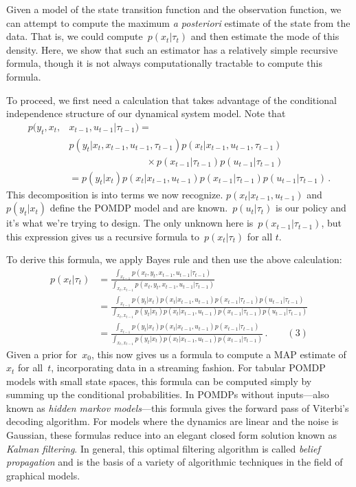 \documentclass{tufte-book}
\begin{document}
Given a model of the state transition function and the observation
function, we can attempt to compute the maximum \emph{a posteriori}
estimate of the state from the data. That is, we could
compute~\(p(x_t | \tau_t)\) and then estimate the mode of this density.
Here, we show that such an estimator has a relatively simple recursive
formula, though it is not always computationally tractable to compute
this formula.

To proceed, we first need a calculation that takes advantage of the
conditional independence structure of our dynamical system model. Note
that \[
\begin{aligned}
p(y_t, x_t, & x_{t-1}, u_{t-1} | \tau_{t-1} )
= \\
&p(y_t| x_t, x_{t-1}, u_{t-1}, \tau_{t-1} )
p(x_t | x_{t-1},u_{t-1}, \tau_{t-1} )\\
 &\qquad\qquad\qquad\qquad\times p(x_{t-1}|\tau_{t-1} )
p(u_{t-1}|\tau_{t-1} )\\
&= p(y_t| x_t )
p(x_t | x_{t-1},u_{t-1} )
p(x_{t-1}|\tau_{t-1} )
p(u_{t-1}|\tau_{t-1} )\,.
\end{aligned}
\] This decomposition is into terms we now recognize.
\(p(x_t | x_{t-1},u_{t-1} )\) and~\(p(y_t| x_t )\) define the POMDP
model and are known.~\(p(u_t|\tau_t)\) is our policy and it's what we're
trying to design. The only unknown here is~\(p(x_{t-1}|\tau_{t-1} )\),
but this expression gives us a recursive formula
to~\(p(x_{t}|\tau_{t} )\) for all \(t\).

To derive this formula, we apply Bayes rule and then use the above
calculation: \[
\begin{aligned}
p(x_t | \tau_t) &=\frac{\int_{x_{t-1}} p(x_t , y_t, x_{t-1}, u_{t-1} | \tau_{t-1}) }
                                                {\int_{x_t,x_{t-1}} p(x_t , y_t, x_{t-1}, u_{t-1}| \tau_{t-1})}\\
&=\frac{\int_{x_{t-1}} p(y_t| x_t ) p(x_t | x_{t-1},u_{t-1} )
p(x_{t-1}|\tau_{t-1} )
p(u_{t-1}|\tau_{t-1} ) }
{\int_{x_{t},x_{t-1}} p(y_t| x_t ) p(x_t | x_{t-1},u_{t-1} )
p(x_{t-1}|\tau_{t-1} )
p(u_{t-1}|\tau_{t-1} )}\\
&=\frac{\int_{x_{t-1}} p(y_t| x_t ) p(x_t | x_{t-1},u_{t-1} )
p(x_{t-1}|\tau_{t-1} ) }
{\int_{x_t,x_{t-1}} p(y_t| x_t ) p(x_t| x_{t-1},u_{t-1} )
p(x_{t-1}|\tau_{t-1} )}\,.\qquad (3)
\end{aligned}
\] Given a prior for~\(x_0\), this now gives us a formula to compute a
MAP estimate of~\(x_t\) for all~\(t\), incorporating data in a streaming
fashion. For tabular POMDP models with small state spaces, this formula
can be computed simply by summing up the conditional probabilities. In
POMDPs without inputs---also known as \emph{hidden markov models}---this
formula gives the forward pass of Viterbi's decoding algorithm. For
models where the dynamics are linear and the noise is Gaussian, these
formulas reduce into an elegant closed form solution known as
\emph{Kalman filtering}. In general, this optimal filtering algorithm is
called \emph{belief propagation} and is the basis of a variety of
algorithmic techniques in the field of graphical
models.
\end{document}
